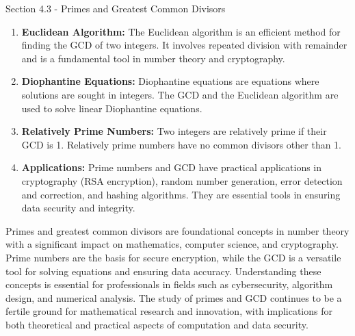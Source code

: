 \begin{notes}{Section 4.3 - Primes and Greatest Common Divisors}
\begin{enumerate}[label=\arabic*.]
        \item \textbf{Euclidean Algorithm:} The Euclidean algorithm is an efficient method for finding the GCD of two integers. It involves repeated division with remainder and is a fundamental tool 
        in number theory and cryptography.
        
        \item \textbf{Diophantine Equations:} Diophantine equations are equations where solutions are sought in integers. The GCD and the Euclidean algorithm are used to solve linear Diophantine equations.
        
        \item \textbf{Relatively Prime Numbers:} Two integers are relatively prime if their GCD is 1. Relatively prime numbers have no common divisors other than 1.
        
        \item \textbf{Applications:} Prime numbers and GCD have practical applications in cryptography (RSA encryption), random number generation, error detection and correction, and hashing algorithms. 
        They are essential tools in ensuring data security and integrity.
    \end{enumerate}

    Primes and greatest common divisors are foundational concepts in number theory with a significant impact on mathematics, computer science, and cryptography. Prime numbers are the basis for secure 
    encryption, while the GCD is a versatile tool for solving equations and ensuring data accuracy. Understanding these concepts is essential for professionals in fields such as cybersecurity, algorithm 
    design, and numerical analysis. The study of primes and GCD continues to be a fertile ground for mathematical research and innovation, with implications for both theoretical and practical aspects 
    of computation and data security.
\end{notes}